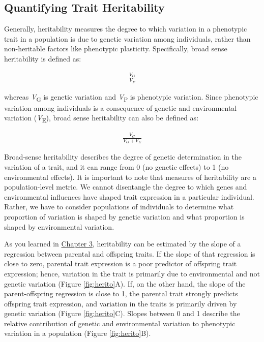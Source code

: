 \documentclass[
]{book}
\begin{document}
\hypertarget{quantifying-trait-heritability}{%
\subsection{Quantifying Trait Heritability}\label{quantifying-trait-heritability}}

Generally, heritability measures the degree to which variation in a phenotypic trait in a population is due to genetic variation among individuals, rather than non-heritable factors like phenotypic plasticity. Specifically, broad sense heritability is defined as:

\begin{align} 
\frac{V_G}{V_P} \label{eq:38}
\end{align}

whereas \emph{V}\textsubscript{G} is genetic variation and \emph{V}\textsubscript{P} is phenotypic variation. Since phenotypic variation among individuals is a consequence of genetic and environmental variation (\emph{V}\textsubscript{E}), broad sense heritability can also be defined as:

\begin{align} 
\frac{V_G}{V_G+V_E} \label{eq:39}
\end{align}

Broad-sense heritability describes the degree of genetic determination in the variation of a trait, and it can range from 0 (no genetic effects) to 1 (no environmental effects). It is important to note that measures of heritability are a population-level metric. We cannot disentangle the degree to which genes and environmental influences have shaped trait expression in a particular individual. Rather, we have to consider populations of individuals to determine what proportion of variation is shaped by genetic variation and what proportion is shaped by environmental variation.

As you learned in \href{a-mechanism-for-change.html\#heritability}{Chapter 3}, heritability can be estimated by the slope of a regression between parental and offspring traits. If the slope of that regression is close to zero, parental trait expression is a poor predictor of offspring trait expression; hence, variation in the trait is primarily due to environmental and not genetic variation (Figure \ref{fig:herito}A). If, on the other hand, the slope of the parent-offspring regression is close to 1, the parental trait strongly predicts offspring trait expression, and variation in the traits is primarily driven by genetic variation (Figure \ref{fig:herito}C). Slopes between 0 and 1 describe the relative contribution of genetic and environmental variation to phenotypic variation in a population (Figure \ref{fig:herito}B).
\end{document}
